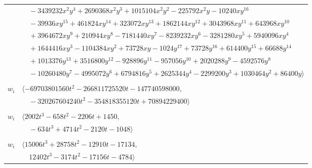 \documentclass[11pt]{article}
\begin{document}
\begin{longtable}{@{}ll@{}}
 & $\quad -3439232x^{2}y^{4}+2690368x^{2}y^{3}+1015104x^{2}y^{2}-225792x^{2}y-10240xy^{16}$\\
 & $\quad -39936xy^{15}+461824xy^{14}+323072xy^{13}+1862144xy^{12}+3043968xy^{11}+643968xy^{10}$\\
 & $\quad +3964672xy^{9}+210944xy^{8}-7181440xy^{7}-8239232xy^{6}-3281280xy^{5}+5940096xy^{4}$\\
 & $\quad +1644416xy^{3}-1104384xy^{2}+73728xy-1024y^{17}+73728y^{16}+614400y^{15}+66688y^{14}$\\
 & $\quad +1013376y^{13}+3516800y^{12}-928896y^{11}-957056y^{10}+2020288y^{9}-4592576y^{8}$\\
 & $\quad -10260480y^{7}-4995072y^{6}+6794816y^{5}+2625344y^{4}-2299200y^{3}+1030464y^{2}+86400y\rangle$\\
\addlinespace[2pt]
\multicolumn{2}{@{}p{0.97\textwidth}@{}}{$i=11$, $D_i=5832$, $e_i=2$, $\rho_{ij}$: $16{:}1, \allowbreak 22{:}1, \allowbreak 24{:}2, \allowbreak 26{:}2, \allowbreak 28{:}2, \allowbreak 30{:}1, \allowbreak 35{:}1, \allowbreak 40{:}1, \allowbreak 42{:}1, \allowbreak 44{:}2, \allowbreak 46{:}1, \allowbreak 50{:}2, \allowbreak 53{:}1, \allowbreak 54{:}2, \allowbreak 55{:}1, \allowbreak 59{:}1, \allowbreak 65{:}2$}\\
$w_i$ & $\langle -69703801560t^{2}-266811725520t-147740598000,$\\
 & $\quad -320267604240t^{2}-354818355120t+70894229400\rangle$\\
\addlinespace[2pt]
\multicolumn{2}{@{}p{0.97\textwidth}@{}}{$i=12$, $D_i=8$, $\rho_{ij}$: $2{:}1, \allowbreak 5{:}2, \allowbreak 10{:}2, \allowbreak 13{:}1, \allowbreak 20{:}2, \allowbreak 21{:}2, \allowbreak 26{:}1, \allowbreak 28{:}2, \allowbreak 38{:}2, \allowbreak 46{:}2, \allowbreak 49{:}1, \allowbreak 55{:}1, \allowbreak 56{:}1$}\\
$w_i$ & $\langle 2002t^{3}-658t^{2}-2206t+1450,$\\
 & $\quad -634t^{3}+4714t^{2}-2120t-1048\rangle$\\
\addlinespace[2pt]
\multicolumn{2}{@{}p{0.97\textwidth}@{}}{$i=13$, $D_i=8$, $\rho_{ij}$: $2{:}1, \allowbreak 3{:}2, \allowbreak 10{:}2, \allowbreak 12{:}2, \allowbreak 23{:}1, \allowbreak 30{:}2, \allowbreak 37{:}2, \allowbreak 38{:}1, \allowbreak 44{:}2, \allowbreak 52{:}1, \allowbreak 55{:}2, \allowbreak 57{:}1, \allowbreak 64{:}2, \allowbreak 67{:}2$}\\
$w_i$ & $\langle 15006t^{3}+28758t^{2}-12910t-17134,$\\
 & $\quad 12402t^{3}-3174t^{2}-17156t-4784\rangle$\\

\end{longtable}
\end{document}
